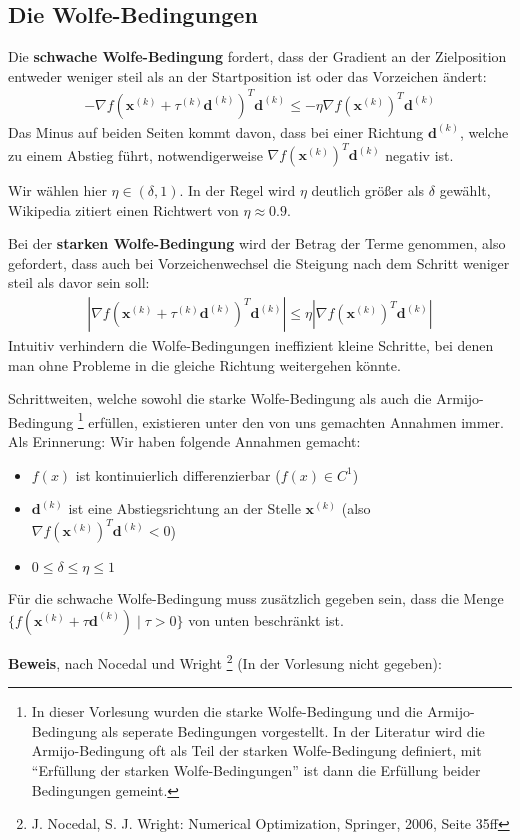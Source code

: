 \documentclass{report}
\newcommand{\tbf}{\textbf}
\newcommand{\xk}{\bm{x}^{(k)}}
\newcommand{\dk}{\bm{d}^{(k)}}
\newcommand{\tauk}{\tau^{(k)}}
\newcommand*{\newpar}{\par\vspace{\baselineskip}\noindent}
\begin{document}
\subsection{Die Wolfe-Bedingungen}
Die \tbf{schwache Wolfe-Bedingung} fordert, dass der Gradient an der Zielposition entweder weniger steil als an der Startposition ist oder das Vorzeichen ändert:
\begin{align*}
-\nabla f(\xk + \tauk \dk)^T \dk \leq -\eta \nabla f(\xk)^T \dk
\end{align*}
Das Minus auf beiden Seiten kommt davon, dass bei einer Richtung $\dk$, welche zu einem Abstieg führt, notwendigerweise $\nabla f(\xk )^T \dk$ negativ ist.
\newpar
Wir wählen hier $\eta \in (\delta, 1)$.  In der Regel wird $\eta$ deutlich größer als $\delta$ gewählt, Wikipedia zitiert einen Richtwert von $\eta \approx 0.9$.
\newpar
Bei der \tbf{starken Wolfe-Bedingung} wird der Betrag der Terme genommen, also gefordert, dass auch bei Vorzeichenwechsel die Steigung nach dem Schritt weniger steil als davor sein soll:
\begin{align*}
|\nabla f(\xk + \tauk \dk)^T \dk| \leq \eta |\nabla f(\xk)^T \dk|
\end{align*}
Intuitiv verhindern die Wolfe-Bedingungen ineffizient kleine Schritte, bei denen man ohne Probleme in die gleiche Richtung weitergehen könnte.
\newpar
Schrittweiten, welche sowohl die starke Wolfe-Bedingung als auch die Armijo-Bedingung
\footnote{In dieser Vorlesung wurden die starke Wolfe-Bedingung und die Armijo-Bedingung als seperate Bedingungen vorgestellt. In der Literatur wird die Armijo-Bedingung oft als Teil der starken Wolfe-Bedingung definiert, mit ``Erfüllung der starken Wolfe-Bedingungen'' ist dann die Erfüllung beider Bedingungen gemeint.}
erfüllen, existieren unter den von uns gemachten Annahmen immer. Als Erinnerung: Wir haben folgende Annahmen gemacht:
\begin{itemize}
 \item $f(x)$ ist kontinuierlich differenzierbar ($f(x) \in C^1$)
 \item $\dk$ ist eine Abstiegsrichtung an der Stelle $\xk$ (also $\nabla f(\xk )^T \dk < 0$)
 \item $0 \leq \delta \leq \eta \leq 1$
\end{itemize}
Für die schwache Wolfe-Bedingung muss zusätzlich gegeben sein, dass die Menge $\{f(\xk + \tau \dk) \mid \tau > 0\}$ von unten beschränkt ist.
\newpar
\tbf{Beweis}, nach Nocedal und Wright \footnote{J. Nocedal, S. J. Wright: Numerical Optimization, Springer, 2006, Seite 35ff} (In der Vorlesung nicht gegeben):
\end{document}
